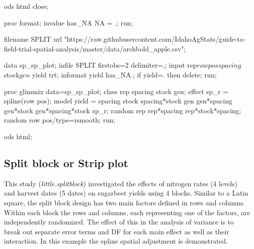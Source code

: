 \documentclass[
]{book}
\newenvironment{Shaded}{\begin{snugshade}}{\end{snugshade}}
\newcommand{\NormalTok}[1]{#1}
\begin{document}
\begin{Shaded}
\begin{Highlighting}[]
\NormalTok{ods html close;}

\NormalTok{proc format;}
\NormalTok{invalue has\_NA}
\NormalTok{ \textquotesingle{}NA\textquotesingle{} = .;}
\NormalTok{run;}

\NormalTok{filename SPLIT url "https://raw.githubusercontent.com/IdahoAgStats/guide{-}to{-}field{-}trial{-}spatial{-}analysis/master/data/archbold\_apple.csv";}

\NormalTok{data sp\_sp\_plot;}
\NormalTok{    infile SPLIT firstobs=2 delimiter=\textquotesingle{},\textquotesingle{};}
\NormalTok{    input rep$ row pos spacing$ stock$ gen$ yield trt;}
\NormalTok{    informat yield has\_NA.;}
\NormalTok{    if yield=. then delete;}
\NormalTok{run;}

\NormalTok{proc glimmix data=sp\_sp\_plot;}
\NormalTok{    class rep spacing stock gen;}
\NormalTok{    effect sp\_r = spline(row pos);}
\NormalTok{    model yield = spacing stock spacing*stock gen gen*spacing gen*stock gen*spacing*stock sp\_r;}
\NormalTok{    random rep rep*spacing rep*stock*spacing;}
\NormalTok{    random row pos/type=rsmooth;}
\NormalTok{run;}
 
\NormalTok{ ods html;}
\end{Highlighting}
\end{Shaded}

\hypertarget{split-block-or-strip-plot}{%
\subsection{Split block or Strip plot}\label{split-block-or-strip-plot}}

This study (\emph{little.splitblock}) investigated the effects of nitrogen rates (4 levels) and harvest dates (5 dates) on sugarbeet yields using 4 blocks. Similar to a Latin square, the split block design has two main factors defined in rows and columns. Within each block the rows and columns, each representing one of the factors, are independently randomized. The effect of this in the analysis of variance is to break out separate error terms and DF for each main effect as well as their interaction. In this example the spline spatial adjustment is demonstrated.
\end{document}
